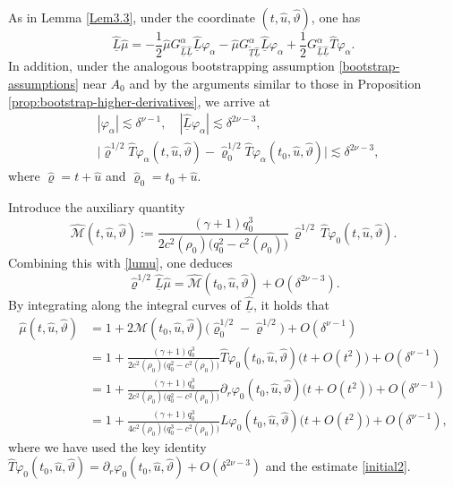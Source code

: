 \documentclass[11pt,twoside]{article}
\def\al{\alpha}
\def\vp{\varphi}
\def\p{\partial}
\begin{document}
As in Lemma \ref{Lem3.3}, under the coordinate $(t, \hat u, \hat\vartheta)$, one has
\begin{equation}\label{lumu}
\hat{\underline L}\hat\mu = -\frac{1}{2}\hat\mu G_{\hat{\underline L}\hat{\underline L}}^\al\hat{\underline L}\vp_\al
- \hat\mu G_{\tilde{\underline T}\hat{\underline L}}^\al \hat{\underline L}\vp_\al
+ \frac{1}{2}G_{\hat{\underline L}\hat{\underline L}}^\al \hat T\vp_\al.
\end{equation}
In addition, under the analogous bootstrapping assumption \eqref{bootstrap-assumptions} near $A_0$
and by the arguments similar to those in Proposition \ref{prop:bootstrap-higher-derivatives},
we arrive at
\begin{align*}
&|\vp_\al|\lesssim\delta^{\nu-1},\quad
|\hat{\underline L}\vp_\al|\lesssim\delta^{2\nu-3},\\
&\bigl|\hat\varrho^{1/2}\hat T\vp_\al(t,\hat u,\hat\vartheta)-\hat\varrho_0^{1/2}\hat T\vp_\al(t_0,\hat u,\hat\vartheta)\bigr|\lesssim\delta^{2\nu-3},
\end{align*}
where \(\hat\varrho=t+\hat u\) and \(\hat\varrho_0=t_0+\hat u\).

Introduce the auxiliary quantity
\[
\hat{\mathscr{M}}(t,\hat u,\hat\vartheta):= \frac{(\gamma+1) q_{0}^{3}} {2c^{2}(\rho_{0})\bigl(q_{0}^{2}-c^{2}(\rho_{0}) \bigr)} \,\hat\varrho^{1/2}\, \hat T\varphi_{0}(t,\hat u,\hat\vartheta).
\]
Combining this with \eqref{lumu}, one deduces
\[
\hat\varrho^{1/2}\hat{\underline L}\hat\mu=\hat{\mathscr M}(t_0,\hat u,\hat\vartheta)+O(\delta^{2\nu-3}).
\]
By integrating along the integral curves of $\hat{\underline L}$, it holds that
\begin{equation}\label{YHCCC-4}
\begin{split}
\hat\mu(t, \hat u,\hat\vartheta)&=1+2\hat{\mathscr M}(t_0,\hat u,\hat\vartheta)\bigl(\hat\varrho_0^{1/2}-\hat\varrho^{1/2}\bigr)+O(\delta^{\nu-1})\\
&=1+\frac{(\gamma+1) q_0^3}{2c^2(\rho_0)\bigl(q_0^2 - c^2(\rho_0)\bigr)} \hat T\vp_0(t_0,\hat u,\hat\vartheta)\bigl(t+O(t^2)\bigr) + O(\delta^{\nu-1}) \\
&= 1 + \frac{(\gamma+1) q_0^3}{2c^2(\rho_0)\bigl(q_0^2 - c^2(\rho_0)\bigr)} \p_r\vp_0(t_0,\hat u,\hat\vartheta)\bigl(t+O(t^2)\bigr) + O(\delta^{\nu-1})\\
&=1+\frac{(\gamma+1) q_0^3}{4c^2(\rho_0)\bigl(q_0^3-c^2(\rho_0)\bigr)} L\vp_0(t_0,\hat u,\hat\vartheta)\bigl(t+O(t^2)\bigr)+O(\delta^{\nu-1}),
\end{split}
\end{equation}
where we have used the key identity \(\hat T\vp_0(t_0,\hat u,\hat\vartheta)=\p_r\vp_0(t_0,\hat u,\hat\vartheta)
+O(\delta^{2\nu-3})\) and the estimate \eqref{initial2}.
\end{document}
